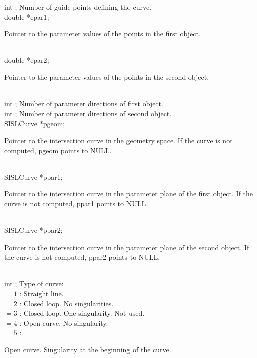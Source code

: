  \> int 	;	\>\>Number of guide points defining the curve.\\
 \> double 	\>*{\fov epar1};   	\>\> \begin{minipg2}
				Pointer to the parameter values of the points in the first object. 
				\end{minipg2}\\[0.3ex]
 \> double	\>*{\fov epar2};	\>\> \begin{minipg2}
				Pointer to the parameter values of the points in the second object.
				\end{minipg2}\\[0.3ex]
 \> int		;		\>\> Number of parameter directions of first object.\\
 \> int		;		\>\>Number of parameter directions of second object.\\
 \> SISLCurve 	\>*{\fov pgeom}; 	\>\> \begin{minipg2}
				Pointer to the intersection curve in the
                           	geometry space. If the curve is not 
                           	computed, pgeom points to NULL.
				\end{minipg2}\\[0.3ex]
 \> SISLCurve 	\>*{\fov ppar1};  	\>\> \begin{minipg2}
				Pointer to the intersection curve in the
                           	parameter plane of the first object. If 
                           	the curve is not computed, ppar1 points 
                           	to NULL.
				\end{minipg2}\\[0.3ex]
 \> SISLCurve 	\>*{\fov ppar2};  	\>\> \begin{minipg2}
				Pointer to the intersection curve in the
                           	parameter plane of the second object. If 
                           	the curve is not computed, ppar2 points 
                           	to NULL.
				\end{minipg2}\\[0.3ex]
 \> int 	;	\>\>Type of curve:\\
	\>\>\>\>\>	$= 1$ :\> Straight line.\\
	\>\>\>\>\>	$= 2$ :\> Closed loop. No singularities.\\
	\>\>\>\>\>	$= 3$ :\> Closed loop. One singularity. Not used.\\
	\>\>\>\>\>	$= 4$ :\> Open curve. No singularity.\\
	\>\>\>\>\>	$= 5$ :\> \begin{minipg5}
				Open curve. Singularity at the 
                           	beginning of the curve.
				\end{minipg5}\\[0.8ex]
